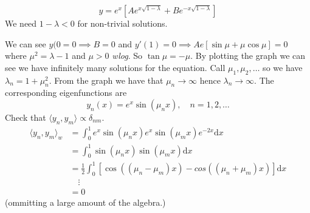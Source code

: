 \documentclass{article}
\begin{document}
\[
	y=e^x\left[Ae^{x\sqrt{1-\lambda}}+Be^{-x\sqrt{1-\lambda}}\right]
\]
We need $ 1-\lambda < 0 $ for non-trivial solutions.\par
We can see $ y(0=0\implies B=0 $ and $ y'(1)=0\implies Ae\left[\sin \mu+\mu\cos\mu\right]=0 $ where $ \mu^2=\lambda -1 $ and $ \mu>0 $ \textit{wlog}. So $ \tan\mu=-\mu $. By plotting the graph we can see we have infinitely many solutions for the equation. Call $ \mu_1,\mu_2,\dots $ so we have $ \lambda_n=1+\mu_n^2 $. From the graph we have that $ \mu_n\to\infty $ hence $ \lambda_n\to \infty $. The corresponding eigenfunctions are
\[
	y_n(x)=e^x\sin(\mu_nx),\quad n=1,2,\dots
\]
Check that $ \langle y_n,y_m\rangle\propto \delta_{nm} $.
\begin{align*}
	\langle y_n,y_m\rangle_w &= \int_0^1e^x\sin(\mu_n x)e^x\sin(\mu_m x)e^{-2x}\mathrm dx\\
				 &= \int_0^1 \sin(\mu_n x)\sin(\mu_m x)\mathrm dx\\
				 &=\frac 12\int_0^1\left[\cos((\mu_n-\mu_m)x)-cos((\mu_n+\mu_m)x)\right]\mathrm dx\\
				 &\quad\vdots\\
				 &= 0
\end{align*}
(ommitting a large amount of the algebra.)
\end{document}
